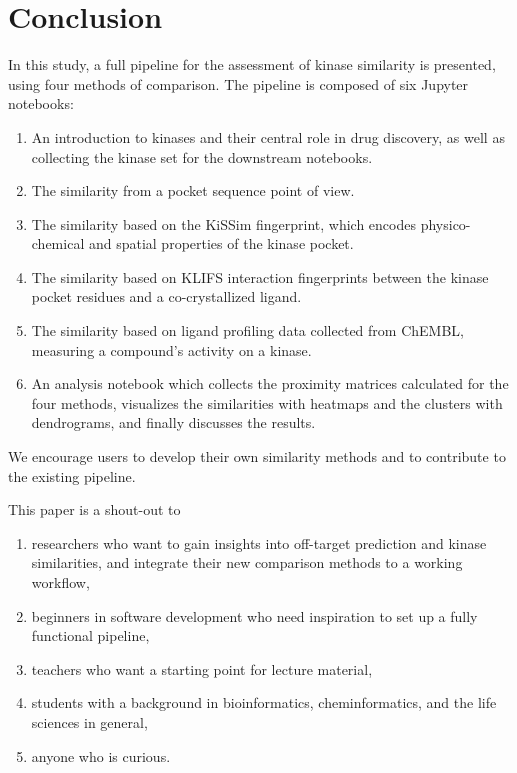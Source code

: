 \documentclass[9pt,training]{livecoms}
\begin{document}
\section{Conclusion}
In this study, a full pipeline for the assessment of kinase similarity is presented, using four methods of comparison. The pipeline is composed of six Jupyter notebooks:
\begin{enumerate}
    \item An introduction to kinases and their central role in drug discovery, as well as collecting the kinase set for the downstream notebooks.
    \item The similarity from a pocket sequence point of view.
    \item The similarity based on the KiSSim fingerprint, which encodes physico-chemical and spatial properties of the kinase pocket.
    \item The similarity based on KLIFS interaction fingerprints between the kinase pocket residues and a co-crystallized ligand.
    \item The similarity based on ligand profiling data collected from ChEMBL, measuring a compound's activity on a kinase.
    \item An analysis notebook which collects the proximity matrices calculated for the four methods, visualizes the similarities with heatmaps and the clusters with dendrograms, and finally discusses the results.
\end{enumerate}

We encourage users to develop their own similarity methods and to contribute to the existing pipeline.

This paper is a shout-out to
\begin{enumerate}
    \item researchers who want to gain insights into off-target prediction and kinase similarities, and integrate their new comparison methods to a working workflow,
    \item beginners in software development who need inspiration to set up a fully functional pipeline,
    \item teachers who want a starting point for lecture material,
    \item students with a background in bioinformatics, cheminformatics, and the life sciences in general,
    \item anyone who is curious.
\end{enumerate}
\end{document}
